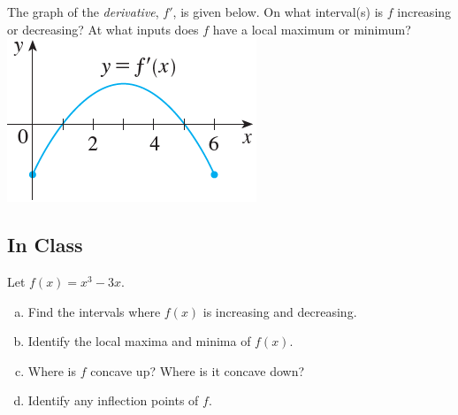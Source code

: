 \documentclass[notes]{subfiles}
\begin{document}
		\begin{ex}
			The graph of the \emph{derivative}, $f'$, is given below.  On what interval(s) is $f$ increasing or decreasing? At what inputs does $f$ have a local maximum or minimum?\\
			\includegraphics{3.3fig2}
		\end{ex}
		
			\newpage
			
	\subsection*{In Class}
		\begin{thm}
		\end{thm}
		
		\begin{ex}
			Let $f(x) = x^3 - 3x$.  
			\begin{enumerate}[(a)]
				\item Find the intervals where $f(x)$ is increasing and decreasing.
					
				\item Identify the local maxima and minima of $f(x)$.
					
				\item Where is $f$ concave up?  Where is it concave down?
					
				\item Identify any inflection points of $f$.
			\end{enumerate}
		\end{ex}
			\newpage
			
\end{document}
